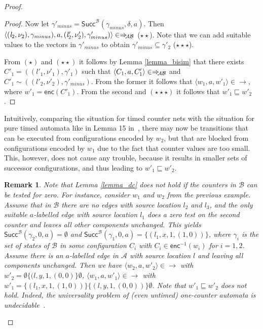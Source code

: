 \documentclass{CSML}
\theoremstyle{plain}\newtheorem{theorem}[thm]{Theorem}
\theoremstyle{plain}\newtheorem{corollary}[thm]{Corollary}
\theoremstyle{plain}\newtheorem{example}[thm]{Example}
\theoremstyle{plain}\newtheorem{lemma}[thm]{Lemma}
\theoremstyle{plain}\newtheorem{remark}[thm]{Remark}
\newcommand{\B}{\mathcal{B}}
\newcommand{\loc}{\mathit{l}}
\renewcommand{\succ}{\mathsf{Succ}}
\newcommand{\enc}{\mathsf{enc}}
\newcommand{\A}{\mathcal{A}}
\newcommand{\transAB}{\Rightarrow_{\hspace{-.8mm}\A\B}}
\begin{document}
\begin{proof}
\begin{proof}
			


			
			Now let $\gamma'_{minus} = \succ^\B(\gamma_{minus},\delta,a)$. 
			Then $\langle (\loc_2,\nu_2),\gamma_{minus}),a,(\loc'_2,\nu'_2),\gamma'_{minus})\rangle\in\transAB$ ($\star\star$). 
			Note that we can add suitable values to the vectors in $\gamma'_{minus}$ to obtain $\gamma'_{minus}\subseteq \gamma'_2$ ($\star\star\star$). 
			
			


			
			From $(\star)$ and $(\star\star)$ it follows by Lemma \ref{lemma_bisim} that there exists
			$C'_1=((\loc'_1,\nu'_1),\gamma'_1)$ such that 
			$\langle C_1,a,C'_1\rangle\in\transAB$ and 
			$C'_1 \sim ((\loc'_2,\nu'_2),\gamma'_{minus})$. 
			From the former it follows that
			$\langle w_1, a, w'_1\rangle\in\to$, where $w'_1=\enc(C'_1)$. 
			From the second and $(\star\star\star)$ it follows that  $w'_1\sqsubseteq w'_2$.
		\end{proof}
		Intuitively, 
		comparing the situation for timed counter nets with the situation for pure timed automata like in Lemma 15 in~\cite{DBLP:conf/lics/OuaknineW04}, 
		there may now be transitions that can be executed from configurations encoded by $w_2$, but that are blocked from configurations encoded by $w_1$ due to the fact that counter values are too small. This, however, does not cause any trouble, because it results in smaller sets of successor configurations, and thus leading to $w'_1\sqsubseteq w'_2$. 
		\begin{remark}
		Note that Lemma  \ref{lemma_dc} does not hold if the counters in $\B$ can be tested for zero. 
		For instance, consider $w_1$ and $w_2$ from the previous example. Assume that in $\B$ there are no edges with source location $\loc_2$ and $\loc_3$, and the only suitable $a$-labelled edge with source location $\loc_1$ 
		does a zero test on the second counter and leaves all other components unchanged. 
		This yields  
		$\succ^\B(\gamma_2,0,a)=\emptyset$ and $\succ^\B(\gamma_1,0,a)=\{(\loc_1,x,1,(1,0))\}$, 
		where $\gamma_i$ is the set of states of $\B$ in some configuration $C_i$ with $C_i\in\enc^{-1}(w_i)$ for $i=1,2$.
		Assume there is an $a$-labelled edge in $\A$ with source location $\loc$ and leaving all components unchanged. 
		Then we have
		$\langle w_2, a, w'_2\rangle\in\to$ with  $w'_2=\emptyset \{(\loc,y,1,(0,0)\}\emptyset$, 
		$\langle w_1, a, w'_1\rangle\in\to$ with 
		$w'_1 = \{(\loc_1,x,1,(1,0))\}\{(\loc,y,1,(0,0))\}\emptyset$. 
		Note that $w'_1\sqsubseteq w'_2$ does \emph{not} hold. 		
		Indeed, the universality problem of (even untimed) one-counter automata is undecidable~\cite{DBLP:journals/jacm/Greibach69,DBLP:journals/mst/Ibarra79}. 

\end{remark}
\end{proof}
\end{document}
